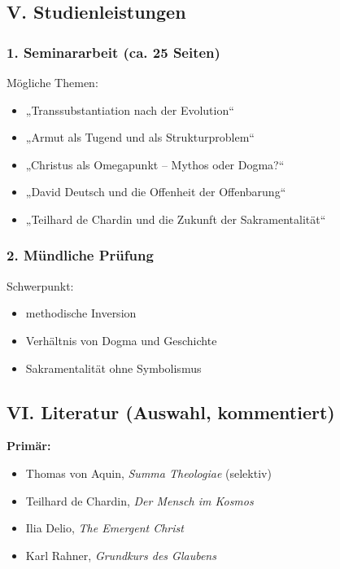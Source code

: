 \documentclass[
]{article}
\begin{document}
\subsection{\texorpdfstring{\textbf{V. Studienleistungen}}{V. Studienleistungen}}\label{v.-studienleistungen}

\subsubsection{\texorpdfstring{\textbf{1. Seminararbeit (ca. 25 Seiten)}}{1. Seminararbeit (ca. 25 Seiten)}}\label{seminararbeit-ca.-25-seiten}

Mögliche Themen:

\begin{itemize}
\item
  „Transsubstantiation nach der Evolution``
\item
  „Armut als Tugend und als Strukturproblem``
\item
  „Christus als Omegapunkt -- Mythos oder Dogma?{\kern0pt}``
\item
  „David Deutsch und die Offenheit der Offenbarung``
\item
  „Teilhard de Chardin und die Zukunft der Sakramentalität``
\end{itemize}

\subsubsection{\texorpdfstring{\textbf{2. Mündliche Prüfung}}{2. Mündliche Prüfung}}\label{muxfcndliche-pruxfcfung}

Schwerpunkt:

\begin{itemize}
\item
  methodische Inversion
\item
  Verhältnis von Dogma und Geschichte
\item
  Sakramentalität ohne Symbolismus
\end{itemize}

\subsection{\texorpdfstring{\textbf{VI. Literatur (Auswahl, kommentiert)}}{VI. Literatur (Auswahl, kommentiert)}}\label{vi.-literatur-auswahl-kommentiert}

\textbf{Primär:}

\begin{itemize}
\item
  Thomas von Aquin, \emph{Summa Theologiae} (selektiv)
\item
  Teilhard de Chardin, \emph{Der Mensch im Kosmos}
\item
  Ilia Delio, \emph{The Emergent Christ}
\item
  Karl Rahner, \emph{Grundkurs des Glaubens}
\end{itemize}
\end{document}

